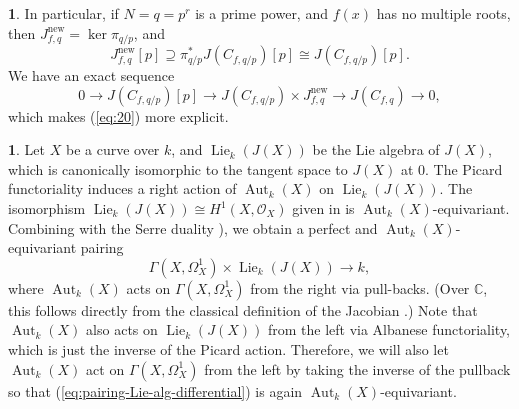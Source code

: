 \documentclass{amsart}[11pt]
\theoremstyle{definition}
\newtheorem{sect}[thm]{}
\numberwithin{equation}{section}
\theoremstyle{notitle}
\begin{document}
\begin{sect}
In particular, if $N=q=p^r$ is a prime power, and $f(x)$ has no
multiple roots, then $J_{f,q}^{\mathrm{new}}=\ker \pi_{q/p}$, and
\begin{equation}
  \label{eq:prime-power-inherence-torsion}
J_{f,q}^{\mathrm{new}}[p]\supseteq \pi_{q/p}^* J(C_{f,q/p})[p] \cong
J(C_{f,q/p})[p]. 
\end{equation}
We have an exact sequence 
\[ 0 \to J(C_{f,q/p})[p]\to J(C_{f, q/p})\times J_{f,q}^{\mathrm{new}}\to
J(C_{f,q})\to 0, \]
which makes (\ref{eq:20}) more explicit. 
\end{sect}
\begin{sect}\label{subsec:Serre-duality-differential}
  Let $X$ be a curve over $k$, and $\operatorname{Lie}_k(J(X))$ be
  the Lie algebra of $J(X)$, which is canonically isomorphic to the
  tangent space to $J(X)$ at $0$. The Picard functoriality induces a
  right action of $\operatorname{Aut}_k(X)$ on $\operatorname{Lie}_k(J(X))$. The
  isomorphism $\operatorname{Lie}_k(J(X))\cong H^1(X, {\mathcal{O}}_X)$ given in
  \cite[Proposition 2.1]{MR861976} is
  $\operatorname{Aut}_k(X)$-equivariant. Combining with the Serre duality
  \cite[Corollary 7.13]{MR0463157}), we obtain a perfect and
  $\operatorname{Aut}_k(X)$-equivariant pairing
\begin{equation}
  \label{eq:pairing-Lie-alg-differential}
  \Gamma(X, \Omega_X^1)\times \operatorname{Lie}_k(J(X))\to k,
\end{equation}
where $\operatorname{Aut}_k(X)$ acts on $\Gamma(X, \Omega_X^1)$ from the right via
pull-backs. (Over ${\mathbb{C}}$, this follows directly from the classical
definition of the Jacobian \cite[Section 2]{MR861976}.) Note that
$\operatorname{Aut}_k(X)$ also acts on $\operatorname{Lie}_k(J(X))$ from the left via Albanese
functoriality, which is just the inverse of the Picard
action. Therefore, we will also let $\operatorname{Aut}_k(X)$ act on $\Gamma(X,
\Omega_X^1)$ from the left by taking the inverse of the pullback so
that (\ref{eq:pairing-Lie-alg-differential}) is again
$\operatorname{Aut}_k(X)$-equivariant.
\end{sect}
\end{document}
